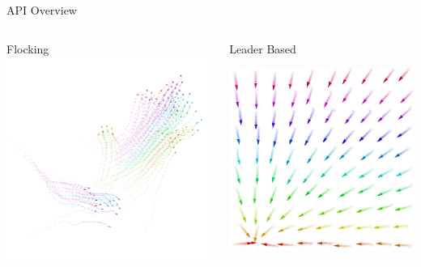 \documentclass[presentation, 9pt]{beamer}\mode<presentation>{\usetheme{AMSBolognaFC}}
\begin{document}
\begin{frame}{API Overview}
\begin{columns}
\begin{column}{0.3\textwidth}
\begin{exampleblock}{Flocking}
\includegraphics[width=\textwidth]{img/flock.png}
\end{exampleblock}

\end{column}

\begin{column}{0.3\textwidth}

	\begin{exampleblock}{Leader Based}

	\includegraphics[width=\textwidth]{img/towards-leader.png}
	\end{exampleblock}
\end{column}


\end{columns}
\end{frame}
\end{document}
